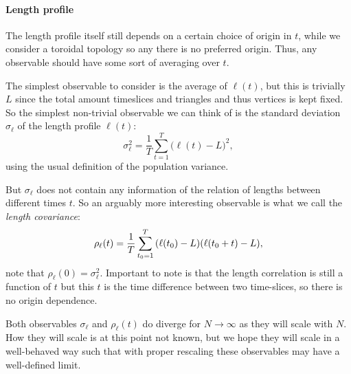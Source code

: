 \paragraph{Length profile}
The length profile itself still depends on a certain choice of origin in $t$, while we consider a toroidal topology so any there is no preferred origin. Thus, any observable should have some sort of averaging over $t$.

The simplest observable to consider is the average of $\ell(t)$, but this is trivially $L$ since the total amount timeslices and triangles and thus vertices is kept fixed.
So the simplest non-trivial observable we can think of is the standard deviation $\sigma_\ell$ of the length profile $\ell(t)$:
\begin{equation}\label{eq:std_meas}
    \sigma_\ell^2 = \frac{1}{T} \sum_{t = 1}^{T} \Big(\ell(t) - L\Big)^2,
\end{equation}
using the usual definition of the population variance.

But $\sigma_\ell$ does not contain any information of the relation of lengths between different times $t$.
So an arguably more interesting observable is what we call the \emph{length covariance}:
\begin{equation}\label{eq:cov_meas}
    \rho_\ell(t) = \frac{1}{T} \sum_{t_0 = 1}^{T} \qty(\ell(t_0) - L)\qty(\ell(t_0 + t) - L),
\end{equation}
note that $\rho_\ell(0) = \sigma_\ell^2$.
Important to note is that the length correlation is still a function of $t$ but this $t$ is the time difference between two time-slices, so there is no origin dependence.

Both observables $\sigma_\ell$ and $\rho_\ell(t)$ do diverge for $N \rightarrow \infty$ as they will scale with $N$.
How they will scale is at this point not known, but we hope they will scale in a well-behaved way such that with proper rescaling these observables may have a well-defined limit.